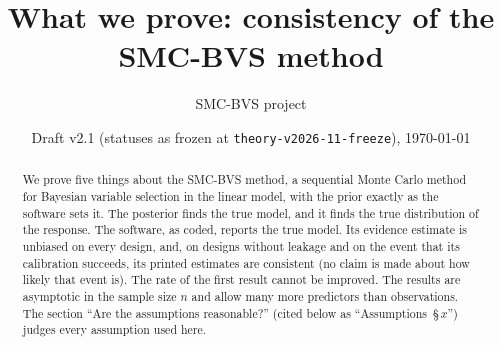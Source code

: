 \documentclass[11pt]{article}
\title{What we prove: consistency of the SMC-BVS method}
\author{SMC-BVS project}
\date{Draft v2.1 (statuses as frozen at \texttt{theory-v2026-11-freeze}), \today}
\begin{document}
\maketitle

\begin{abstract}
\noindent
We prove five things about the SMC-BVS method, a sequential Monte Carlo method for Bayesian variable selection in the
linear model, with the prior exactly as the software sets it. The posterior finds the true model, and it finds the true
distribution of the response. The software, as coded, reports the true model. Its evidence estimate is unbiased on every
design, and, on designs without leakage and on the event that its calibration succeeds, its printed estimates are
consistent (no claim is made about how likely that event is). The rate of the first result cannot be
improved. The results are asymptotic in the sample size $n$ and allow many more predictors than observations.
The section ``Are the assumptions reasonable?'' (cited below as ``Assumptions~\S\,$x$'') judges every assumption used here.
\end{abstract}










\appendix


\end{document}
